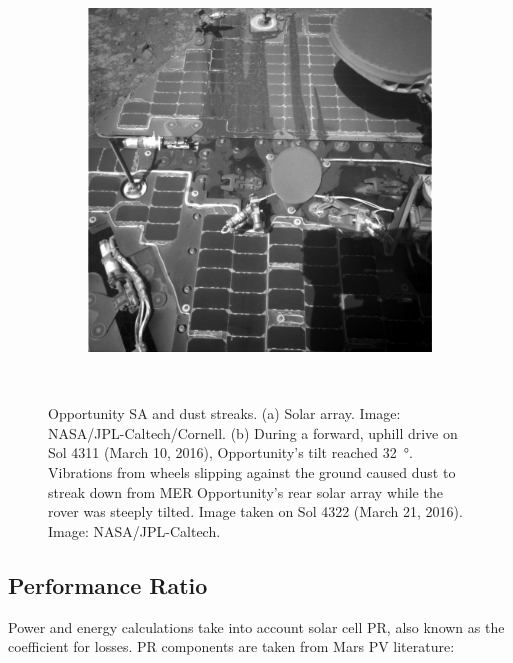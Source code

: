 \begin{figure}[h]
\begin{subfigure}[t]{\subfigureWidth}
            \includegraphics[height=\graphicsHeight]{sections/mars-solar-energy/photovoltaic-energy/images/mer-opportunity-dust-streaks.png}
            \label{fig:image:mer-opportunity-dust-streaks}
    \end{subfigure}\\[0.8ex]
    \caption[Opportunity solar arrays and dust streaks]
    {Opportunity \ac{SA} and dust streaks. (a) Solar array. Image: \ac{NASA}/\ac{JPL}-Caltech/Cornell. (b) During a forward, uphill drive on Sol 4311 (March 10, 2016), Opportunity's tilt reached \SI{32}{\degree}. Vibrations from wheels slipping against the ground caused dust to streak down from \ac{MER} Opportunity's rear solar array while the rover was steeply tilted. Image taken on Sol 4322 (March 21, 2016). Image: \ac{NASA}/\ac{JPL}-Caltech.}
    \label{fig:mer-solar-arrays-and-dust-streaks}
\vspace{-2ex}
\end{figure}




\subsection{Performance Ratio}
\label{sec:PowerAndEnergyPredictions:PerformanceRatio}
Power and energy calculations take into account solar cell \ac{PR}, also known as the coefficient for losses. \ac{PR} components are taken from Mars \ac{PV} literature:

